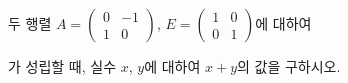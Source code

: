 두 행렬 $A=\begin{pmatrix} 0 & -1 \\ 1 & 0 \end{pmatrix}$, $E=\begin{pmatrix} 1 & 0 \\ 0 & 1 \end{pmatrix}$에 대하여 \par\smallskip{}\par\smallskip\noindent 가 성립할 때, 실수 $x$, $y$에 대하여 $x+y$의 값을 구하시오.
